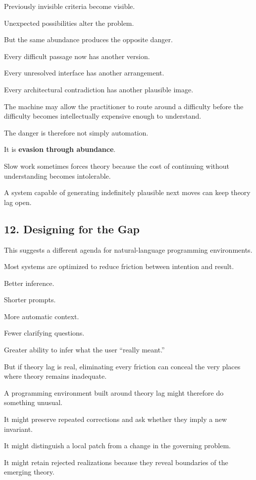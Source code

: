 \documentclass[
]{article}
\begin{document}
Previously invisible criteria become visible.

Unexpected possibilities alter the problem.

But the same abundance produces the opposite danger.

Every difficult passage now has another version.

Every unresolved interface has another arrangement.

Every architectural contradiction has another plausible image.

The machine may allow the practitioner to route around a difficulty
before the difficulty becomes intellectually expensive enough to
understand.

The danger is therefore not simply automation.

It is \textbf{evasion through abundance}.

Slow work sometimes forces theory because the cost of continuing without
understanding becomes intolerable.

A system capable of generating indefinitely plausible next moves can
keep theory lag open.

\subsection{12. Designing for the Gap}\label{designing-for-the-gap}

This suggests a different agenda for natural-language programming
environments.

Most systems are optimized to reduce friction between intention and
result.

Better inference.

Shorter prompts.

More automatic context.

Fewer clarifying questions.

Greater ability to infer what the user ``really meant.''

But if theory lag is real, eliminating every friction can conceal the
very places where theory remains inadequate.

A programming environment built around theory lag might therefore do
something unusual.

It might preserve repeated corrections and ask whether they imply a new
invariant.

It might distinguish a local patch from a change in the governing
problem.

It might retain rejected realizations because they reveal boundaries of
the emerging theory.
\end{document}
